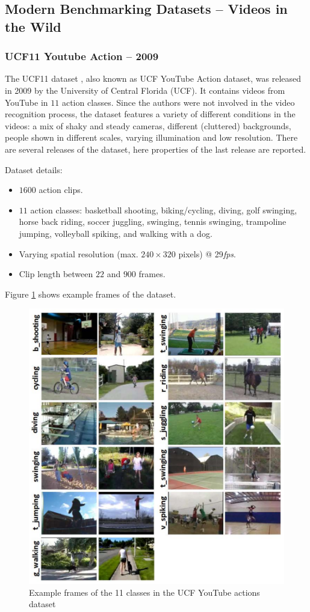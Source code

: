 \subsection{Modern Benchmarking Datasets -- Videos in the Wild}

\subsubsection{UCF11 Youtube Action -- 2009}
The UCF11 dataset \cite{liu_recognizing_2009}, also known as UCF YouTube Action dataset, was released in 2009 by the University of Central Florida (UCF).
It contains videos from YouTube in $11$ action classes.
Since the authors were not involved in the video recognition process, the dataset features a variety of different conditions in the videos: a mix of shaky and steady cameras, different (cluttered) backgrounds, people shown in different scales, varying illumination and low resolution.
There are several releases of the dataset, here properties of the last release are reported.

Dataset details: \cite{_center_????-1}
\begin{itemize}
    \item $1600$ action clips.
    \item $11$ action classes: basketball shooting, biking/cycling, diving, golf swinging, horse back riding, soccer juggling, swinging, tennis swinging, trampoline jumping, volleyball spiking, and walking with a dog.
    \item Varying spatial resolution (max. $240 \times 320$ pixels) @ 29\textit{fps}.
    \item Clip length between $22$ and $900$ frames.
\end{itemize}

Figure \ref{fig:ucfyoutube_example} shows example frames of the dataset.

\begin{figure}[H]
    \centering
    \includegraphics[width=.7\textwidth]{img_datasets/ucfyoutube_example}
    \caption{Example frames of the 11 classes in the UCF YouTube actions dataset \cite{liu_recognizing_2009}}
    \label{fig:ucfyoutube_example}
\end{figure}


